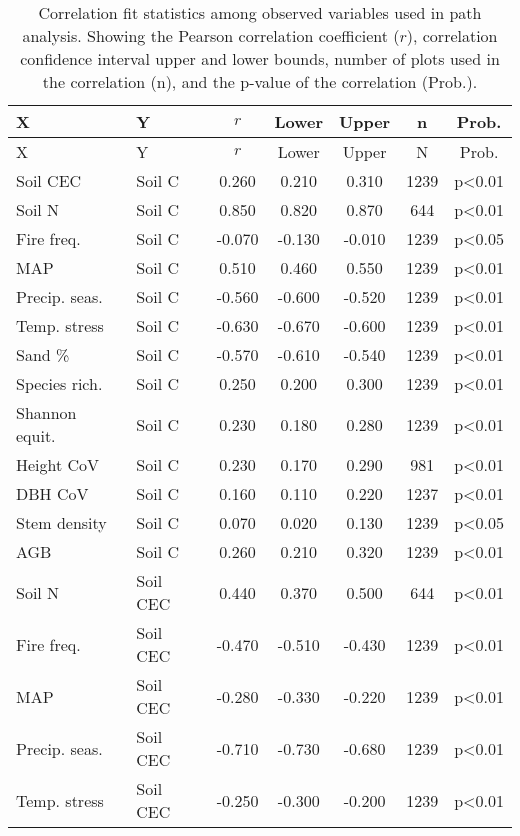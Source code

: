 \begin{longtable}{llSSSS[table-format=3.2,table-column-width=0.8cm]c}
\caption[Correlation fit statistics]{Correlation fit statistics among observed variables used in path analysis. Showing the Pearson correlation coefficient ($r$), correlation confidence interval upper and lower bounds, number of plots used in the correlation (n), and the p-value of the correlation (Prob.).} 
\label{befr:corr_ci} \\
\toprule
{X} & {Y} & {$r$} & {Lower} & {Upper} & {n} & {Prob.} \\ 
\midrule
\endfirsthead
\toprule
{X} & {Y} & {$r$} & {Lower} & {Upper} & {N} & {Prob.} \\ 
\midrule
\endhead
Soil CEC & Soil C & 0.260 & 0.210 & 0.310 & 1239 & p<0.01 \\ 
Soil N & Soil C & 0.850 & 0.820 & 0.870 & 644 & p<0.01 \\ 
Fire freq. & Soil C & -0.070 & -0.130 & -0.010 & 1239 & p<0.05 \\ 
MAP & Soil C & 0.510 & 0.460 & 0.550 & 1239 & p<0.01 \\ 
Precip. seas. & Soil C & -0.560 & -0.600 & -0.520 & 1239 & p<0.01 \\ 
Temp. stress & Soil C & -0.630 & -0.670 & -0.600 & 1239 & p<0.01 \\ 
Sand \% & Soil C & -0.570 & -0.610 & -0.540 & 1239 & p<0.01 \\ 
Species rich. & Soil C & 0.250 & 0.200 & 0.300 & 1239 & p<0.01 \\ 
Shannon equit. & Soil C & 0.230 & 0.180 & 0.280 & 1239 & p<0.01 \\ 
Height CoV & Soil C & 0.230 & 0.170 & 0.290 & 981 & p<0.01 \\ 
DBH CoV & Soil C & 0.160 & 0.110 & 0.220 & 1237 & p<0.01 \\ 
Stem density & Soil C & 0.070 & 0.020 & 0.130 & 1239 & p<0.05 \\ 
AGB & Soil C & 0.260 & 0.210 & 0.320 & 1239 & p<0.01 \\ 
Soil N & Soil CEC & 0.440 & 0.370 & 0.500 & 644 & p<0.01 \\ 
Fire freq. & Soil CEC & -0.470 & -0.510 & -0.430 & 1239 & p<0.01 \\ 
MAP & Soil CEC & -0.280 & -0.330 & -0.220 & 1239 & p<0.01 \\ 
Precip. seas. & Soil CEC & -0.710 & -0.730 & -0.680 & 1239 & p<0.01 \\ 
Temp. stress & Soil CEC & -0.250 & -0.300 & -0.200 & 1239 & p<0.01 \\ 

\end{longtable}
